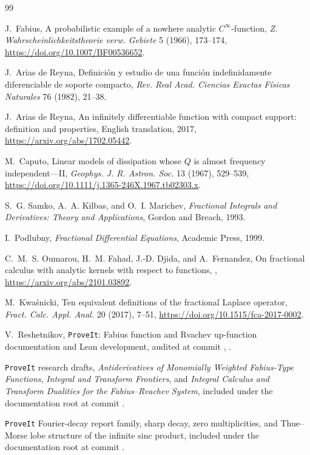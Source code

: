 \documentclass[11pt,oneside]{article}
\theoremstyle{definition}
\theoremstyle{remark}
\newcommand{\1}{\mathbf 1}
\begin{document}
\begin{thebibliography}{99}

J.~Fabius,
\newblock A probabilistic example of a nowhere analytic $C^\infty$-function,
\newblock \emph{Z. Wahrscheinlichkeitstheorie verw. Gebiete} 5 (1966),
173--174,
\newblock \url{https://doi.org/10.1007/BF00536652}.

J.~Arias de Reyna,
\newblock Definici\'on y estudio de una funci\'on indefinidamente diferenciable
de soporte compacto,
\newblock \emph{Rev. Real Acad. Ciencias Exactas F\'isicas Naturales} 76 (1982),
21--38.

J.~Arias de Reyna,
\newblock An infinitely differentiable function with compact support:
definition and properties,
\newblock English translation, 2017,
\newblock \url{https://arxiv.org/abs/1702.05442}.

M.~Caputo,
\newblock Linear models of dissipation whose $Q$ is almost frequency
independent---II,
\newblock \emph{Geophys. J. R. Astron. Soc.} 13 (1967), 529--539,
\newblock \url{https://doi.org/10.1111/j.1365-246X.1967.tb02303.x}.

S.~G. Samko, A.~A. Kilbas, and O.~I. Marichev,
\newblock \emph{Fractional Integrals and Derivatives: Theory and Applications},
\newblock Gordon and Breach, 1993.

I.~Podlubny,
\newblock \emph{Fractional Differential Equations},
\newblock Academic Press, 1999.

C.~M.~S. Oumarou, H.~M. Fahad, J.-D. Djida, and A.~Fernandez,
\newblock On fractional calculus with analytic kernels with respect to functions,
,
\newblock \url{https://arxiv.org/abs/2101.03892}.

M.~Kwa\'snicki,
\newblock Ten equivalent definitions of the fractional Laplace operator,
\newblock \emph{Fract. Calc. Appl. Anal.} 20 (2017), 7--51,
\newblock \url{https://doi.org/10.1515/fca-2017-0002}.

V.~Reshetnikov,
\newblock \texttt{ProveIt}: Fabius function and Rvachev up-function
documentation and Lean development,
\newblock audited at commit \RepoCommit,
\newblock \RepoRoot.

\texttt{ProveIt} research drafts,
\newblock \emph{Antiderivatives of Monomially Weighted Fabius-Type Functions},
\emph{Integral and Transform Frontiers}, and
\emph{Integral Calculus and Transform Dualities for the Fabius--Rvachev System},
\newblock included under the documentation root at commit \RepoCommit.

\texttt{ProveIt} Fourier-decay report family,
\newblock sharp decay, zero multiplicities, and Thue--Morse lobe structure of
the infinite sinc product,
\newblock included under the documentation root at commit \RepoCommit.

\end{thebibliography}
\end{document}
